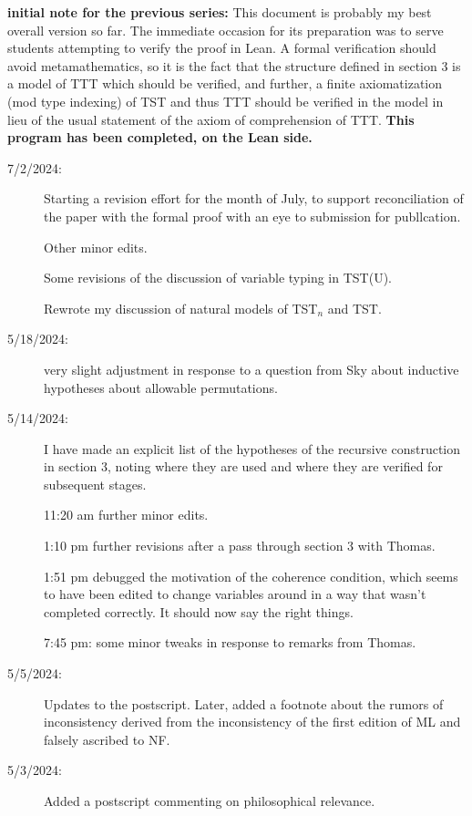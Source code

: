 \documentclass[112pt]{article}
\begin{document}
{\bf initial note for the previous series:}  This document is probably my best overall version so far.  The immediate occasion for its preparation was to serve students attempting to verify the proof in Lean.  A formal verification should avoid metamathematics, so it is the fact that the structure defined in section 3 is a model of TTT which should be verified, and further, a finite axiomatization (mod type indexing) of TST and thus TTT should be verified in the model in lieu of the usual statement of the axiom of comprehension of TTT.  {\bf This program has been completed, on the Lean side.}
\begin{description}

\item[7/2/2024:]  Starting a revision effort for the month of July, to support reconciliation of the paper with the formal proof with an eye to submission for publlcation.

Other minor edits.

Some revisions of the discussion of variable typing in TST(U).

Rewrote my discussion of natural models of TST$_n$ and TST.

\item[5/18/2024:]  very slight adjustment in response to a question from Sky about inductive hypotheses about allowable permutations.

\item[5/14/2024:]  I have made an explicit list of the hypotheses of the recursive construction in section 3, noting where they are used and where they are verified for subsequent stages.

11:20 am further minor edits.

1:10 pm further revisions after a pass through section 3 with Thomas.

1:51 pm debugged the motivation of the coherence condition, which seems to have been edited to change variables around in a way that wasn't completed correctly.  It should now say the right things.

7:45 pm:  some minor tweaks in response to remarks from Thomas.

\item[5/5/2024:]  Updates to the postscript.  Later, added a footnote about the rumors of inconsistency derived from the inconsistency of the first edition of ML and falsely ascribed to NF.

\item[5/3/2024:]  Added a postscript commenting on philosophical relevance.


\end{description}
\end{document}
